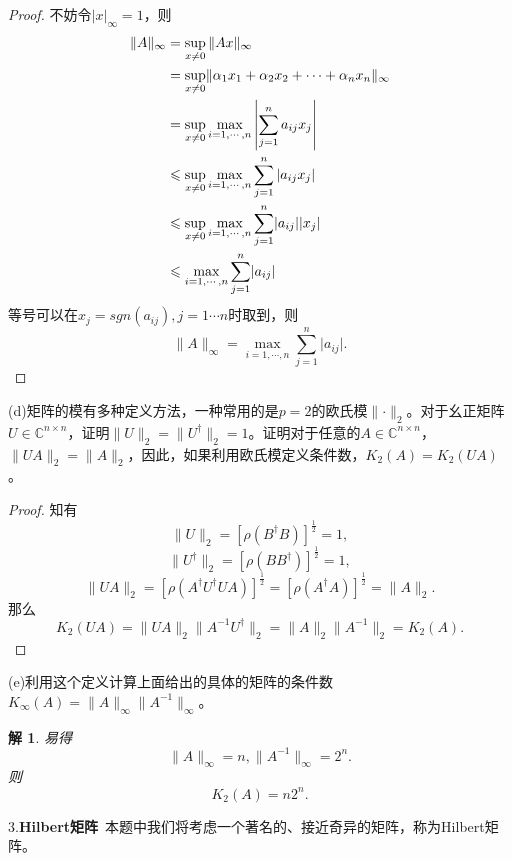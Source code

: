 \documentclass[10pt]{ctexart}
\newtheorem*{solution}{解}
\begin{document}
\begin{proof}
    不妨令$\lvert x\rvert_\infty=1$，则
    \begin{align}
        \lVert A\rVert_{\infty}&=\sup\limits_{x\neq 0}{\lVert Ax\rVert_\infty}\notag\\
        &=\sup\limits_{x\neq 0}\lVert\alpha_1x_1+\alpha_2x_2+\cdots+\alpha_nx_n\rVert_\infty\notag\\
        &=\sup\limits_{x\neq 0}\max\limits_{i=1,\cdots,n}{\left\lvert\sum\limits_{j=1}^{n}a_{ij}x_j\right\rvert}\notag\\
        &\leqslant\sup\limits_{x\neq 0}\max\limits_{i=1,\cdots,n}{\sum\limits_{j=1}^{n}\left\lvert a_{ij}x_j\right\rvert}\notag\\
        &\leqslant\sup\limits_{x\neq 0}\max\limits_{i=1,\cdots,n}{\sum\limits_{j=1}^{n}\lvert a_{ij}\rvert \lvert x_j\rvert}\notag\\
        &\leqslant\max\limits_{i=1,\cdots,n}{\sum\limits_{j=1}^{n}\lvert a_{ij}\rvert}\notag
    \end{align}
    等号可以在$x_j=sgn(a_{ij}),j=1\cdots n$时取到，则
    $$\lVert A\rVert_\infty=\max\limits_{i=1,\cdots,n}{\sum\limits_{j=1}^{n}\lvert a_{ij}\rvert}.$$
\end{proof}
(d)矩阵的模有多种定义方法，一种常用的是$p=2$的欧氏模$\lVert\cdot\rVert_2$。对于幺正矩阵$U\in\mathbb{C}^{n\times n}$，证明$\lVert U\rVert_2=\lVert U^\dagger\rVert_2=1$。证明对于任意的$A
\in\mathbb{C}^{n\times n}$，$\lVert UA\rVert_2=\lVert A\rVert_2$，因此，如果利用欧氏模定义条件数，$K_2(A)=K_2(UA)$。
\begin{proof}
    知有
    $$\lVert U\rVert_2=[\rho(B^\dagger B)]^{\frac{1}{2}}=1,$$
    $$\lVert U^\dagger\rVert_2=[\rho(B B^\dagger)]^{\frac{1}{2}}=1,$$
    $$\lVert UA\rVert_2=[\rho(A^\dagger U^\dagger UA)]^{\frac{1}{2}}=[\rho(A^\dagger A)]^{\frac{1}{2}}=\lVert A\rVert_2.$$
    那么
    $$K_2(UA)=\lVert UA\rVert_2\lVert A^{-1}U^\dagger\rVert_2=\lVert A\rVert_2\lVert A^{-1}\rVert_2=K_2(A).$$
\end{proof}
(e)利用这个定义计算上面给出的具体的矩阵的条件数$K_\infty(A)=\lVert A\rVert_\infty\lVert A^{-1}\rVert_\infty$。
\begin{solution}
    易得
    $$\lVert A\rVert_\infty=n,\lVert A^{-1}\rVert_\infty=2^n.$$
    则
    $$K_2(A)=n2^n.$$
\end{solution}
3.\textbf{Hilbert矩阵}\  本题中我们将考虑一个著名的、接近奇异的矩阵，称为Hilbert矩阵。
\end{document}

